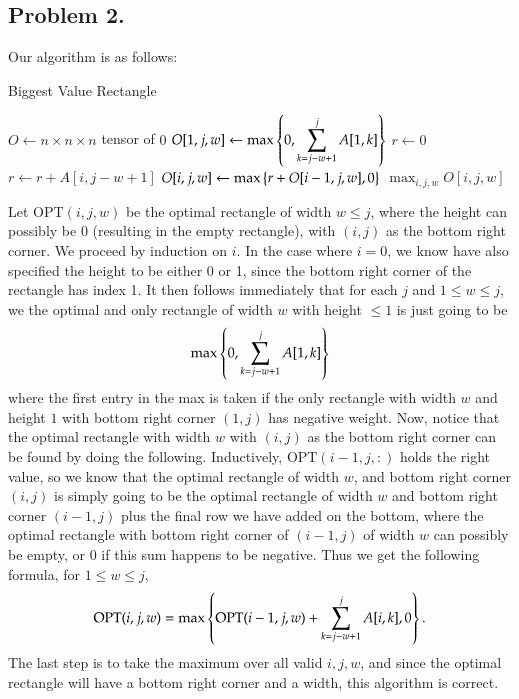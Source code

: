 \documentclass[12pt]{article}
\theoremstyle{definitionstyle}
\newcommand{\SET}[1]{\Set{\mskip-\medmuskip #1 \mskip-\medmuskip}}
\newcommand{\OPT}{\mathrm{OPT}}
\begin{document}
    \subsection*{Problem 2.}
    Our algorithm is as follows:
    \begin{algorithm}
        \caption{Biggest Value Rectangle}
        \begin{algorithmic}
            \State $O \gets n \times n \times n$ tensor of $0$
                    \State $O[1, j, w] \gets \max\SET{0, \displaystyle \sum_{k=j-w+1}^j A[1,k]}$
                \EndFor
            \EndFor
                    \State $r \gets 0$
                        \State $r \gets r + A[i, j-w+1]$
                        \State $O[i,j,w] \gets \max \SET{r + O[i-1, j, w], 0}$
                    \EndFor
                \EndFor
            \EndFor
            \State \Return $\displaystyle \max_{i, j, w} O[i,j,w]$
            \EndProcedure
        \end{algorithmic}
    \end{algorithm}

    Let $\OPT(i,j,w)$ be the optimal rectangle of width $w \leq j$, where the height can possibly be 0 (resulting in the empty rectangle), with $(i,j)$ as the bottom right corner. We proceed by induction on $i$. In the case where $i = 0$, we know have also specified the height to be either 0 or 1, since the bottom right corner of the rectangle has index 1. It then follows immediately that for each $j$ and $1 \leq w \leq j$, we the optimal and only rectangle of width $w$ with height $\leq 1$ is just going to be
    \begin{align*}
        \max \SET{0, \sum_{k=j-w+1}^j A[1, k]}
    \end{align*}
    where the first entry in the max is taken if the only rectangle with width $w$ and height $1$ with bottom right corner $(1, j)$ has negative weight. Now, notice that the optimal rectangle with width $w$ with $(i,j)$ as the bottom right corner can be found by doing the following. Inductively, $\OPT(i-1, j, :)$ holds the right value, so we know that the optimal rectangle of width $w$, and bottom right corner $(i, j)$ is simply going to be the optimal rectangle of width $w$ and bottom right corner $(i-1, j)$ plus the final row we have added on the bottom, where the optimal rectangle with bottom right corner of $(i-1, j)$ of width $w$ can possibly be empty, or 0 if this sum happens to be negative. Thus we get the following formula, for $1 \leq w \leq j$,
    \begin{align*}
        \OPT(i,j,w) = \max \SET{\OPT(i-1,j,w) + \sum_{k=j-w+1}^j A[i, k], 0}.
    \end{align*}
    The last step is to take the maximum over all valid $i,j,w$, and since the optimal rectangle will have a bottom right corner and a width, this algorithm is correct.
\end{document}
